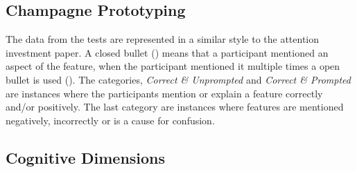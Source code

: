 \subsection{Champagne Prototyping}
\metasheep

The data from the tests are represented in a similar style to the attention investment paper\cite{blackwell2002first}. A closed bullet (\mn) means that a participant mentioned an aspect of the feature, when the participant mentioned it multiple times a open bullet is used (\mns). The categories, \textit{Correct \& Unprompted} and \textit{Correct \& Prompted} are instances where the participants mention or explain a feature correctly and/or positively. The last category are instances where features are mentioned negatively, incorrectly or is a cause for confusion.



\subsection{Cognitive Dimensions}
\metasheep

\begin{table}[H]
	\caption{Cognitive Dimensions Findings}
	\label{tab:cog-dim-findings}
\end{table}




